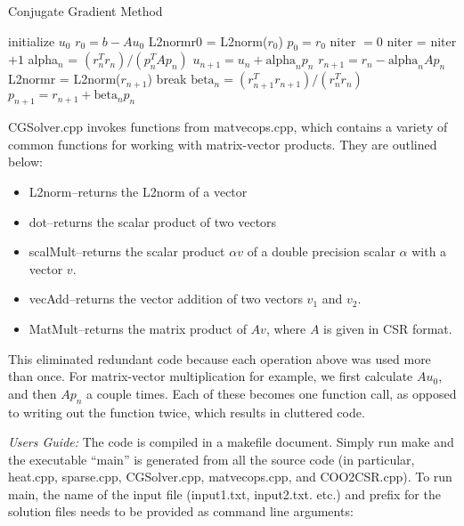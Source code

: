 \documentclass{article}
\begin{document}
\begin{algorithm}
\caption{Conjugate Gradient Method}
\begin{algorithmic}	
	\STATE initialize $u_0$
	\STATE $r_0 = b-Au_0$
	\STATE L2normr0 = L2norm($r_0$)
	\STATE $p_0 = r_0$
	\STATE niter $=0$
		\STATE niter = niter $+1$
		\STATE alpha$_n$ = $(r_n^Tr_n)/(p_n^TAp_n)$
		\STATE $u_{n+1} = u_n+\text{alpha}_np_n$
		\STATE $r_{n+1} = r_n - \text{alpha}_nAp_n$
		\STATE L2normr = L2norm($r_{n+1}$)
		\STATE break
		\ENDIF
		\STATE $\text{beta}_n = (r_{n+1}^Tr_{n+1})/(r_n^Tr_n)$
		\STATE $p_{n+1} = r_{n+1} + \text{beta}_np_n$
		
	\ENDWHILE
\end{algorithmic}
\end{algorithm}


CGSolver.cpp invokes functions from matvecops.cpp, which contains a variety of common functions for working with matrix-vector products.  They are outlined below:
\begin{itemize}
\item L2norm--returns the L2norm of a vector
\item dot--returns the scalar product of two vectors
\item scalMult--returns the scalar product $\alpha v$ of a double precision scalar $\alpha$ with a vector $v$.
\item vecAdd--returns the vector addition of two vectors $v_1$ and $v_2$.  
\item MatMult--returns the matrix product of $Av$, where $A$ is given in CSR format.

\end{itemize}

This eliminated redundant code because each operation above was used more than once.  For matrix-vector multiplication for example, we first calculate $Au_0$, and then $Ap_n$ a couple times.  Each of these becomes one function call, as opposed to writing out the function twice, which results in cluttered code.
\newline

\emph{Users Guide:} \newline
\indent The code is compiled in a makefile document.  Simply run make and the executable ``main'' is generated from all the source code (in particular, heat.cpp, sparse.cpp, CGSolver.cpp, matvecops.cpp, and COO2CSR.cpp).  To run main, the name of the input file (input1.txt, input2.txt. etc.) and prefix for the solution files needs to be provided as command line arguments:
\end{document}
